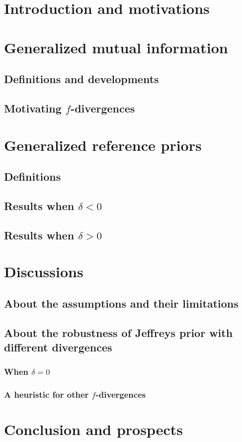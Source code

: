 
\section{Introduction and motivations}


\section{Generalized mutual information}

\subsection{Definitions and developments}

\subsection{Motivating $f$-divergences}


\section{Generalized reference priors}

\subsection{Definitions}

\subsection{Results when $\delta<0$}

\subsection{Results when $\delta>0$}


\section{Discussions}

    \subsection{About the assumptions and their limitations}


    \subsection{About the robustness of Jeffreys prior with different divergences}


        \subsubsection{When $\delta=0$}

        \subsubsection{A heuristic for other $f$-divergences}


\section{Conclusion and prospects}













